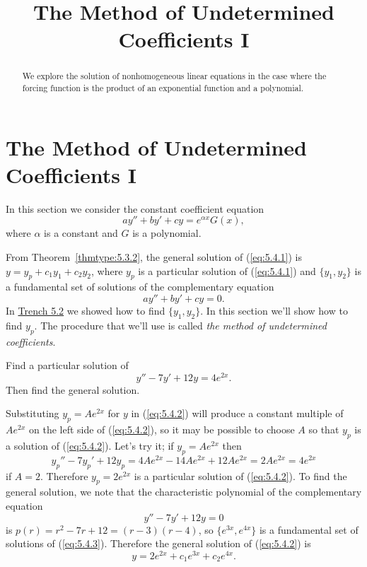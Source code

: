 \documentclass{ximera}
\title{The Method of Undetermined Coefficients I}
\begin{document}
 
\begin{abstract}
 We explore the solution of nonhomogeneous linear equations in the case where the forcing function is the product of an exponential function and a polynomial.
\end{abstract}
 
\maketitle
 
\section*{The Method of Undetermined Coefficients I}
 
In this section we consider the constant coefficient equation
\begin{equation} \label{eq:5.4.1}
ay''+by'+cy=e^{\alpha x}G(x),
\end{equation}
where $\alpha$ is a constant and $G$ is a polynomial.
 
 
From Theorem~\ref{thmtype:5.3.2}, the general solution of (\ref{eq:5.4.1})
is
$y=y_p+c_1y_1+c_2y_2$, where $y_p$ is a particular solution of
(\ref{eq:5.4.1}) and $\{y_1,y_2\}$ is a fundamental set of
solutions of the complementary equation
$$
ay''+by'+cy=0.
$$
In \href{https://ximera.osu.edu/ode/main/constantCoefficientHomogeneousEquations/constantCoefficientHomogeneousEquations}{Trench 5.2} we showed how to find $\{y_1,y_2\}$. In this
section we'll show how to find $y_p$. The procedure that we'll use
is called \textit{the method of undetermined coefficients}.
 
 
\begin{example}\label{example:5.4.1}
Find a particular solution of
\begin{equation} \label{eq:5.4.2}
y''-7y'+12y=4e^{2x}.
\end{equation}
Then find the general solution.
 
 
\begin{explanation}
Substituting $y_p=Ae^{2x}$ for $y$ in (\ref{eq:5.4.2}) will produce a
constant multiple of $Ae^{2x}$ on the left side of (\ref{eq:5.4.2}), so it
may be possible to choose $A$ so that $y_p$ is a solution of
(\ref{eq:5.4.2}). Let's try it;   if $y_p=Ae^{2x}$ then
$$
y_p''-7y_p'+12y_p=4Ae^{2x}-14Ae^{2x}+12Ae^{2x}=2Ae^{2x}=4e^{2x}
$$
if $A=2$. Therefore $y_p=2e^{2x}$ is a particular solution of
(\ref{eq:5.4.2}). To find the general solution, we note that the
characteristic polynomial of the complementary equation
\begin{equation} \label{eq:5.4.3}
y''-7y'+12y=0
\end{equation}
is $p(r)=r^2-7r+12=(r-3)(r-4)$, so $\{e^{3x},e^{4x}\}$ is a
fundamental set of solutions of (\ref{eq:5.4.3}). Therefore the general
solution of (\ref{eq:5.4.2}) is
$$
 y=2e^{2x}+c_1e^{3x}+c_2e^{4x}.
$$
 
\end{explanation}
\end{example}
 
\end{document}
